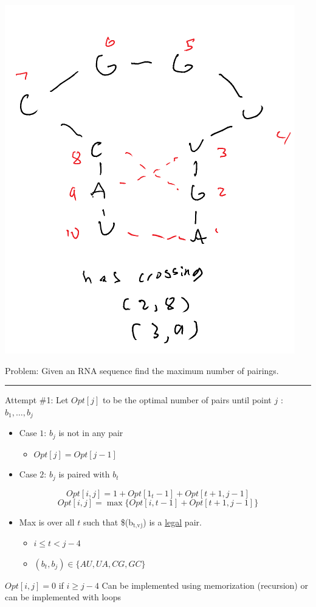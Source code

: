 \documentclass[11pt]{article}
\begin{document}
\begin{center}
\includegraphics[width=.9\linewidth]{./Images/i90.png}
\end{center}

Problem: Given an RNA sequence find the maximum number of pairings.

\noindent\rule{\textwidth}{0.5pt}
Attempt \#1: Let \(Opt[j]\) to be the optimal number of pairs until point \(j\) : \(b_1,\ldots,b_j\)
\begin{itemize}
\item Case \(1\): \(b_j\) is not in any pair
\begin{itemize}
\item \(Opt[j] = Opt[j-1]\)
\end{itemize}
\item Case \(2\): \(b_j\) is paired with \(b_t\)
\end{itemize}
$$Opt[i,j] = 1 + Opt[1_t-1]+Opt[t+1,j-1]$$
$$Opt[i,j] = \max \{Opt[i,t-1]+Opt[t+1,j-1]\}$$
\begin{itemize}
\item Max is over all \(t\) such that \$(b\(_{\text{t,v}}\)\(_{\text{j}}\)) is a \uline{legal} pair.
\begin{itemize}
\item \(i \leq t < j-4\)
\item \((b_t,b_j) \in \{AU, UA, CG, GC\}\)
\end{itemize}
\end{itemize}
\(Opt[i,j] = 0\) if \(i \geq j-4\)
Can be implemented using memorization (recursion) or can be implemented with loops
\end{document}
